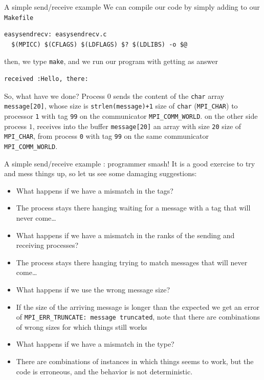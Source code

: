 \documentclass[xcolor={svgnames,usenames}]{beamer}
\begin{document}
\begin{frame}[fragile]{A simple send/receive example}
\small
We can compile our code by simply adding to our \texttt{Makefile} 
\begin{verbatim}
easysendrecv: easysendrecv.c
  $(MPICC) $(CFLAGS) $(LDFLAGS) $? $(LDLIBS) -o $@
\end{verbatim}
then, we type \texttt{make}, and we run our program with  getting as answer
\begin{verbatim}
received :Hello, there:
\end{verbatim}
So, what have we done?
{\scriptsize {}}
Process $0$ sends the content of the \texttt{char} array \texttt{message[20]}, whose size is \texttt{strlen(message)+1} size of \texttt{char} (\texttt{MPI_CHAR}) to processor \texttt{1} with tag \texttt{99} on the communicator \texttt{MPI_COMM_WORLD}.
{\scriptsize {}}
on the other side process $1$, receives into the buffer \texttt{message[20]} an array with size \texttt{20} size of \texttt{MPI_CHAR}, from process \texttt{0} with tag \texttt{99} on the same communicator \texttt{MPI_COMM_WORLD}.
\end{frame}

\begin{frame}{A simple send/receive example : programmer smash!}
It is a good exercise to try and mess things up, so let us see some damaging suggestions:
\begin{itemize}
	\item<1-> What happens if we have a mismatch in the tags?
	\item[A:]<2-> The process stays there hanging waiting for a message with a tag that will never come\ldots 
	\item<1-> What happens if we have a mismatch in the ranks of the sending and receiving processes?
	\item[A:]<3-> The process stays there hanging trying to match messages that will never come\ldots 
	\item<1-> What happens if we use the wrong message size?
	\item[A:]<4-> If the size of the arriving message is longer than the expected we get an error of \texttt{MPI_ERR_TRUNCATE: message truncated}, note that there are combinations of wrong sizes for which things still works
	\item<1-> What happens if we have a mismatch in the type?
	\item[A:]<5-> There are combinations of instances in which things seems to work, \alert{but} the code is erroneous, and the behavior is not deterministic.
\end{itemize}
\end{frame}
\end{document}
